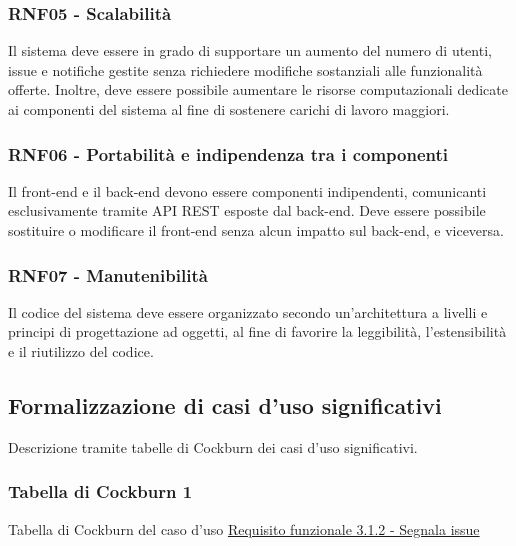 \documentclass[a4paper,12pt]{article}
\begin{document}
\subsubsection{RNF05 - Scalabilità}
Il sistema deve essere in grado di supportare un aumento del numero di utenti, issue e notifiche gestite senza richiedere modifiche sostanziali alle funzionalità offerte. Inoltre, deve essere possibile aumentare le risorse computazionali dedicate ai componenti del sistema al fine di sostenere carichi di lavoro maggiori.

\subsubsection{RNF06 - Portabilità e indipendenza tra i componenti}
Il front-end e il back-end devono essere componenti indipendenti, comunicanti esclusivamente tramite API REST esposte dal back-end. Deve essere possibile sostituire o modificare il front-end senza alcun impatto sul back-end, e viceversa.

\subsubsection{RNF07 - Manutenibilità}
Il codice del sistema deve essere organizzato secondo un'architettura a livelli e principi di progettazione ad oggetti, al fine di favorire la leggibilità, l'estensibilità e il riutilizzo del codice.

\subsection{Formalizzazione di casi d'uso significativi}
Descrizione tramite tabelle di Cockburn dei casi d'uso significativi.

\subsubsection{Tabella di Cockburn 1}
\label{sec:CKB01}
Tabella di Cockburn del caso d'uso \hyperref[sec:RE03]{Requisito funzionale 3.1.2 - Segnala issue}
\end{document}
